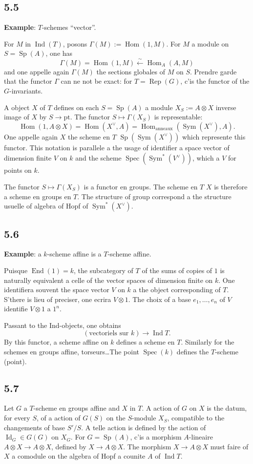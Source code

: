 \documentclass[12pt,a4paper]{article}
\theoremstyle{plain}
\theoremstyle{definition}
\theoremstyle{remark}
\DeclareMathOperator{\Hom}{Hom}
\DeclareMathOperator{\End}{End}
\DeclareMathOperator{\Spec}{Spec}
\DeclareMathOperator{\Ind}{Ind}
\DeclareMathOperator{\Rep}{Rep}
\DeclareMathOperator{\Sym}{Sym}
\DeclareMathOperator{\Sp}{Sp}
\DeclareMathOperator{\Id}{Id}
\newcommand{\pt}{\mathrm{pt}}
\begin{document}
\subsection*{5.5}
\textbf{Example}: $T$-schemes ``vector''.

For $M$ in $\Ind(T)$, posons $\Gamma(M) := 
\Hom(1,M)$. For $M$ a module on $S = 
\Sp(A)$, one has
\[
\Gamma(M) = 
\Hom(1,M) 
\xleftarrow{\sim} 
\Hom_A(A,M)
\]
and one appelle again $\Gamma(M)$ the sections globales of $M$ on $S$. Prendre garde that the functor $\Gamma$ can ne not be exact: for $T = 
\Rep(G)$, c'is the functor of the $G$-invariants.

A object $X$ of $T$ defines on each $S = 
\Sp(A)$ a module $X_S := A 
\otimes X$ inverse image of $X$ by $S 
\to 
\pt$. The functor $S 
\mapsto 
\Gamma(X_S)$ is representable:
\[
\Hom(1, A 
\otimes X) = 
\Hom(X^\vee, A) = 
\Hom_{\text{anneaux}}(\Sym(X^\vee), A).
\]
One appelle again $X$ the scheme en $T$ $\Sp(\Sym(X^\vee))$ which represente this functor. This notation is parallele a the usage of identifier a space vector of dimension finite $V$ on $k$ and the scheme $\Spec(\Sym^*(V^\vee))$, which a $V$ for points on $k$.

The functor $S 
\mapsto 
\Gamma(X_S)$ is a functor en groups. The scheme en $T$ $X$ is therefore a scheme en groups en $T$. The structure of group correspond a the structure usuelle of algebra of Hopf of $\Sym^*(X^\vee)$.

\subsection*{5.6}
\textbf{Example}: a $k$-scheme affine is a $T$-scheme affine.

Puisque $\End(1) = k$, the subcategory of $T$ of the sums of copies of $1$ is naturally equivalent a celle of the vector spaces of dimension finite on $k$. One identifiera souvent the space vector $V$ on $k$ a the object corresponding of $T$. S'there is lieu of preciser, one ecrira $V 
\otimes 1$. The choix of a base $e_1,\ldots,e_n$ of $V$ identifie $V 
\otimes 1$ a $1^n$.

Passant to the Ind-objects, one obtains
\[
(\text{vectoriels sur } k) 
\longrightarrow 
\Ind T.
\]
By this functor, a scheme affine on $k$ defines a scheme en $T$. Similarly for the schemes en groups affine, torseurs\ldots The point $\Spec(k)$ defines the $T$-scheme (point).

\subsection*{5.7}
Let $G$ a $T$-scheme en groups affine and $X$ in $T$. A action of $G$ on $X$ is the datum, for every $S$, of a action of $G(S)$ on the $S$-module $X_S$, compatible to the changements of base $S'/S$. A telle action is defined by the action of $\Id_G 
\in G(G)$ on $X_G$. For $G = 
\Sp(A)$, c'is a morphism $A$-lineaire $A 
\otimes X 
\to A 
\otimes X$, defined by $X 
\to A 
\otimes X$. The morphism $X 
\to A 
\otimes X$ must faire of $X$ a comodule on the algebra of Hopf a counite $A$ of $\Ind T$.
\end{document}
